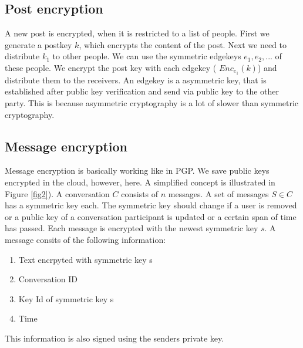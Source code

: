 \documentclass{scrartcl}
\begin{document}
 \subsection{Post encryption}
A new post is encrypted, when it is restricted to a list of people. 
First we generate a postkey $k$, which encrypts the content of the post. Next we need to distribute $k_1$ to other people. We can use the symmetric edgekeys $e_1, e_2, ...$ of these people. We encrypt the post key with each edgekey ( $Enc_{e_1} (k)$) and distribute them to the receivers. An edgekey is a asymmetric key, that is established after public key verification and send via public key to the other party. This is because asymmetric cryptography is a lot of slower than symmetric cryptography.
 \subsection{Message encryption}
 

  
  Message encryption is basically working like in PGP. We save  public keys encrypted in the cloud, however, here. A simplified concept is illustrated in Figure \ref{fig2}). 
  A conversation $C$ consists of $n$ messages. A set of messages $S \in C$ has a symmetric key each. The symmetric key should change if a user is removed or a public key of a conversation participant is updated or a certain span of time has passed. Each message is encrypted with the newest symmetric key $s$.
  A message consits of the following information:
  
  
  \begin{enumerate}
\item Text encrpyted with symmetric key s
\item Conversation ID
\item Key Id of symmetric key s
\item Time
\end{enumerate}
This information is also signed using the senders private key.
\end{document}
